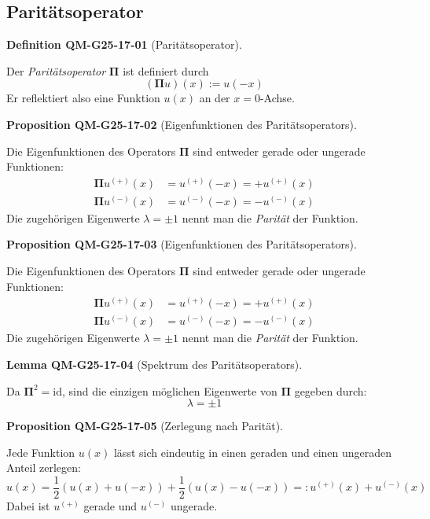 \documentclass[10pt, letterpaper]{article}
\newcommand{\CustomHeading}[3]{%
  \par\medskip\noindent%
  \textbf{#1 #2} \textnormal{(#3)}.\enskip%
}
\newenvironment{DEF}[2]{\CustomHeading{Definition}{#1}{#2}}{}
\newenvironment{PROP}[2]{\CustomHeading{Proposition}{#1}{#2}}{}
\newenvironment{LEM}[2]{\CustomHeading{Lemma}{#1}{#2}}{}
\begin{document}
\subsection{Paritätsoperator}

\begin{DEF}{QM-G25-17-01}{Paritätsoperator}
Der \emph{Paritätsoperator} $\boldsymbol{\Pi}$ ist definiert durch
\[
(\boldsymbol{\Pi} u)(x) := u(-x)
\]
Er reflektiert also eine Funktion $u(x)$ an der $x=0$-Achse.
\end{DEF}

\begin{PROP}{QM-G25-17-02}{Eigenfunktionen des Paritätsoperators}
Die Eigenfunktionen des Operators $\boldsymbol{\Pi}$ sind entweder gerade oder ungerade Funktionen:
\[
\begin{aligned}
\boldsymbol{\Pi} u^{(+)}(x) &= u^{(+)}(-x) = +u^{(+)}(x) \\
\boldsymbol{\Pi} u^{(-)}(x) &= u^{(-)}(-x) = -u^{(-)}(x)
\end{aligned}
\]
Die zugehörigen Eigenwerte $\lambda = \pm 1$ nennt man die \emph{Parität} der Funktion.
\end{PROP}

\begin{PROP}{QM-G25-17-03}{Eigenfunktionen des Paritätsoperators}
Die Eigenfunktionen des Operators $\boldsymbol{\Pi}$ sind entweder gerade oder ungerade Funktionen:
\[
\begin{aligned}
\boldsymbol{\Pi} u^{(+)}(x) &= u^{(+)}(-x) = +u^{(+)}(x) \\
\boldsymbol{\Pi} u^{(-)}(x) &= u^{(-)}(-x) = -u^{(-)}(x)
\end{aligned}
\]
Die zugehörigen Eigenwerte $\lambda = \pm 1$ nennt man die \emph{Parität} der Funktion.
\end{PROP}

\begin{LEM}{QM-G25-17-04}{Spektrum des Paritätsoperators}
Da $\boldsymbol{\Pi}^2 = \mathrm{id}$, sind die einzigen möglichen Eigenwerte von $\boldsymbol{\Pi}$ gegeben durch:
\[
\lambda = \pm 1
\]
\end{LEM}

\begin{PROP}{QM-G25-17-05}{Zerlegung nach Parität}
Jede Funktion $u(x)$ lässt sich eindeutig in einen geraden und einen ungeraden Anteil zerlegen:
\[
u(x) = \frac{1}{2}(u(x) + u(-x)) + \frac{1}{2}(u(x) - u(-x)) =: u^{(+)}(x) + u^{(-)}(x)
\]
Dabei ist $u^{(+)}$ gerade und $u^{(-)}$ ungerade.
\end{PROP}
\end{document}
